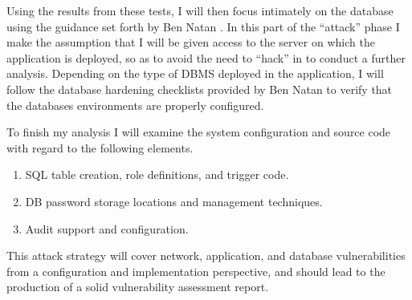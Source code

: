 \documentclass{sig-alternate}
\begin{document}
Using the results from these tests, I will then focus intimately on the database using the guidance set forth by 
Ben Natan \cite{ben2005-SDS}. In this part of the ``attack'' phase I make the assumption that I will be given access to the 
server on which the application is deployed, so as to avoid the need to ``hack'' in to conduct a further analysis. 
Depending on the type of DBMS deployed in the application, I will follow the database hardening checklists 
provided by Ben Natan to verify that the databases environments are properly configured. 

To finish my analysis I will examine the system configuration and source code with regard to the following elements.

\begin{enumerate}
	\item SQL table creation, role definitions, and trigger code.
	\item DB password storage locations and management techniques.
	\item Audit support and configuration.
\end{enumerate}

This attack strategy will cover network, application, and database vulnerabilities from a configuration
and implementation perspective, and should lead to the production of a solid vulnerability assessment report. 

\balance
\end{document}
